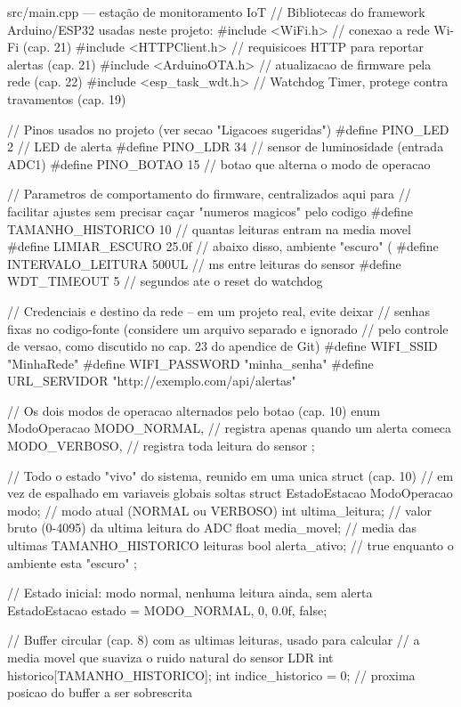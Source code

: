 \begin{codigoc}{src/main.cpp — estação de monitoramento IoT}
// Bibliotecas do framework Arduino/ESP32 usadas neste projeto:
#include <WiFi.h>          // conexao a rede Wi-Fi (cap. 21)
#include <HTTPClient.h>    // requisicoes HTTP para reportar alertas (cap. 21)
#include <ArduinoOTA.h>    // atualizacao de firmware pela rede (cap. 22)
#include <esp_task_wdt.h>  // Watchdog Timer, protege contra travamentos (cap. 19)

// Pinos usados no projeto (ver secao "Ligacoes sugeridas")
#define PINO_LED    2    // LED de alerta
#define PINO_LDR    34   // sensor de luminosidade (entrada ADC1)
#define PINO_BOTAO  15   // botao que alterna o modo de operacao

// Parametros de comportamento do firmware, centralizados aqui para
// facilitar ajustes sem precisar caçar "numeros magicos" pelo codigo
#define TAMANHO_HISTORICO   10      // quantas leituras entram na media movel
#define LIMIAR_ESCURO       25.0f   // abaixo disso, ambiente "escuro" (%
#define INTERVALO_LEITURA   500UL   // ms entre leituras do sensor
#define WDT_TIMEOUT         5       // segundos ate o reset do watchdog

// Credenciais e destino da rede -- em um projeto real, evite deixar
// senhas fixas no codigo-fonte (considere um arquivo separado e ignorado
// pelo controle de versao, como discutido no cap. 23 do apendice de Git)
#define WIFI_SSID     "MinhaRede"
#define WIFI_PASSWORD "minha_senha"
#define URL_SERVIDOR  "http://exemplo.com/api/alertas"

// Os dois modos de operacao alternados pelo botao (cap. 10)
enum ModoOperacao {
    MODO_NORMAL,    // registra apenas quando um alerta comeca
    MODO_VERBOSO,   // registra toda leitura do sensor
};

// Todo o estado "vivo" do sistema, reunido em uma unica struct (cap. 10)
// em vez de espalhado em variaveis globais soltas
struct EstadoEstacao {
    ModoOperacao modo;     // modo atual (NORMAL ou VERBOSO)
    int ultima_leitura;    // valor bruto (0-4095) da ultima leitura do ADC
    float media_movel;     // media das ultimas TAMANHO_HISTORICO leituras
    bool alerta_ativo;     // true enquanto o ambiente esta "escuro"
};

// Estado inicial: modo normal, nenhuma leitura ainda, sem alerta
EstadoEstacao estado = {MODO_NORMAL, 0, 0.0f, false};

// Buffer circular (cap. 8) com as ultimas leituras, usado para calcular
// a media movel que suaviza o ruido natural do sensor LDR
int historico[TAMANHO_HISTORICO];
int indice_historico = 0;   // proxima posicao do buffer a ser sobrescrita


\end{codigoc}
